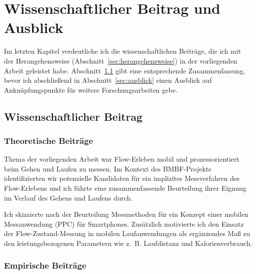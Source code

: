 

\chapter{Wissenschaftlicher Beitrag und Ausblick}

\label{cha:wissenschaftlicher_beitrag_und_ausblick}

Im letzten Kapitel verdeutliche ich die wissenschaftlichen Beiträge, die ich mit der Herangehensweise (Abschnitt~\ref{sec:herangehensweise}) in der vorliegenden Arbeit geleistet habe. Abschnitt~\ref{sec:wissenschaftlicher_beitrag} gibt eine entsprechende Zusammenfassung, bevor ich abschließend in Abschnitt~\ref{sec:ausblick} einen Ausblick auf Anknüpfungspunkte für weitere Forschungsarbeiten gebe.

\section{Wissenschaftlicher Beitrag} 

\label{sec:wissenschaftlicher_beitrag}

\subsection{Theoretische Beiträge} 

\label{sub:theoretische_beitrage}

Thema der vorliegenden Arbeit war Flow-Erleben mobil und prozessorientiert beim Gehen und Laufen zu messen. Im Kontext des \acs{BMBF}-Projekts identifizierten wir potenzielle Kandidaten für ein implizites Messverfahren des Flow-Erlebens und ich führte eine zusammenfassende Beurteilung ihrer Eignung im Verlauf des Gehens und Laufens durch. 

Ich skizzierte nach der Beurteilung Messmethoden für ein Konzept einer mobilen Messanwendung (\ac{PPC}) für Smartphones. Zusätzlich motivierte ich den Einsatz der Flow-Zustand-Messung in mobilen Laufanwendungen als ergänzendes Maß zu den leistungsbezogenen Parametern wie z.~B. Laufdistanz und Kalorienverbrauch.

\subsection{Empirische Beiträge} 

\label{sub:empirische_beitrage}

